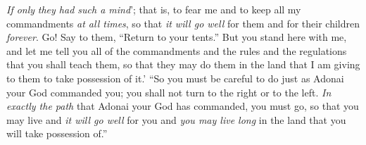 \begin{biblechapter}
\verse \textit{If only} \textit{they had such a mind}’; that is, to fear me and to keep all my commandments \textit{at all times}, so that \textit{it will go well} for them and for their children \textit{forever}.
\verse Go! Say to them, “Return to your tents.”
\verse But you stand here with me, and let me tell you all of the commandments and the rules and the regulations that you shall teach them, so that they may do them in the land that I am giving to them to take possession of it.’
\verse “So you must be careful to do just as Adonai your God commanded you; you shall not turn to the right or to the left.
\verse \textit{In exactly the path} that Adonai your God has commanded, you must go, so that you may live and \textit{it will go well} for you and \textit{you may live long} in the land that you will take possession of.”
\end{biblechapter}

